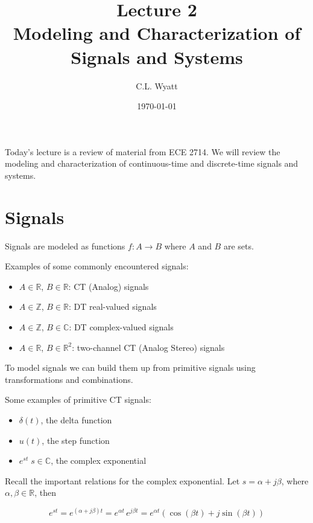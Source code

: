 \documentclass{article}
\begin{document}
\title{Lecture 2\\ Modeling and Characterization of Signals and Systems}
\author{C.L. Wyatt}
\date{\today}
\maketitle

Today's lecture is a review of material from ECE 2714. We will review the modeling and characterization of continuous-time and discrete-time signals and systems.

\section{Signals}

Signals are modeled as functions $f: A \rightarrow B$ where $A$ and $B$ are sets.

Examples of some commonly encountered signals:

\begin{itemize}
\item
  $A\in \mathbb{R}$, $B\in \mathbb{R}$: CT (Analog) signals
\item
  $A\in \mathbb{Z}$, $B\in \mathbb{R}$: DT real-valued signals
\item
  $A\in \mathbb{Z}$, $B\in \mathbb{C}$: DT complex-valued signals
\item
  $A\in \mathbb{R}$, $B\in \mathbb{R}^2$: two-channel CT (Analog Stereo) signals
\end{itemize}


To model signals we can build them up from primitive signals using transformations and combinations.

Some examples of primitive CT signals:

\begin{itemize}
\item
  $\delta(t)$, the delta function
\item
  $u(t)$, the step function
\item
  $e^{st}\; s\in\mathbb{C}$, the complex exponential
\end{itemize}

Recall the important relations for the complex exponential. Let $s = \alpha + j\beta$, where $\alpha, \beta \in \mathbb{R}$, then

\begin{equation}
  e^{st} = e^{(\alpha + j\beta)t} = e^{\alpha t}\, e^{j\beta t} = e^{\alpha t}\left(\cos(\beta t) + j\sin(\beta t) \right)
\end{equation}
\end{document}

